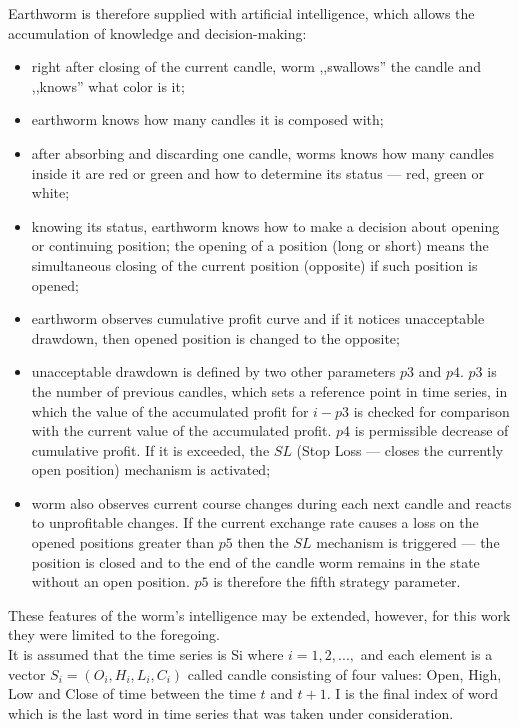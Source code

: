 \documentclass[runningheads,a4paper]{llncs}
\begin{document}
Earthworm is therefore supplied with artificial intelligence, which allows the accumulation of knowledge and decision-making:
\begin{itemize}
\item right after closing of the current candle, worm ,,swallows'' the candle and ,,knows'' what color is it;
\item earthworm knows how many candles it is composed with;
\item after absorbing and discarding one candle, worms knows how many candles inside it are red or green and how to determine its status --- red, green or white;
\item knowing its status, earthworm knows how to make a decision about opening or continuing position; the opening of a position (long or short) means the simultaneous closing of the current position (opposite) if such position is opened;
\item earthworm observes cumulative profit curve and if it  notices unacceptable drawdown, then opened position is changed to the opposite;
\item unacceptable drawdown is defined by two other parameters $p3$ and $p4$. $p3$ is the number of previous candles, which sets a reference point in time series, in which the value of the accumulated profit for $i-p3$ is checked for comparison with the current value of the accumulated profit. $p4$ is permissible decrease of cumulative profit. If it is exceeded, the $SL$ (Stop Loss --- closes the currently open position) mechanism is activated;
\item worm also observes current course changes during  each next candle and reacts to unprofitable changes. If the current exchange rate causes a loss on the opened positions greater than $p5$ then the $SL$ mechanism is triggered --- the position is closed and to the end of the candle worm remains in the state without an open position. $p5$ is therefore the fifth strategy parameter. 
\end{itemize}

These features of the worm's intelligence may be extended, however, for this work they were limited to the foregoing. \\

It is assumed that the time series is Si where $i = 1, 2, ...,$ and each element is a vector $S_i = (O_i, H_i, L_i, C_i)$ called candle consisting of four values: Open, High, Low and Close of time between the time $t$ and $t+1$. I is the final index of word which is the last word in time series that was taken under consideration.\\
\end{document}
